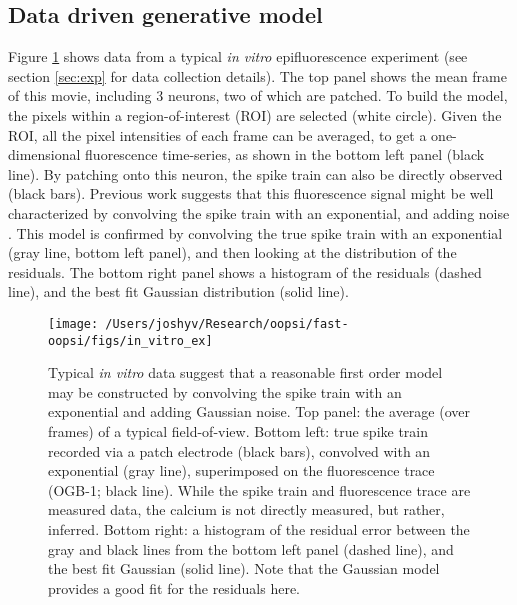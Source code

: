 \subsection{Data driven generative model} \label{sec:model}

Figure \ref{fig:in_vitro_ex} shows data from a typical \emph{in vitro} epifluorescence experiment (see section \ref{sec:exp} for data collection details).  The top panel shows the mean frame of this movie, including 3 neurons, two of which are patched.  To build the model, the pixels within a region-of-interest (ROI) are selected (white circle).  Given the ROI, all the pixel intensities of each frame can be averaged, to get a one-dimensional fluorescence time-series, as shown in the bottom left panel (black line).  By patching onto this neuron, the spike train can also be directly observed (black bars). Previous work suggests that this fluorescence signal might be well characterized by convolving the spike train with an exponential, and adding noise \cite{ImagingManual}.  This model is confirmed by convolving the true spike train with an exponential (gray line, bottom left panel), and then looking at the distribution of the residuals.  The bottom right panel shows a histogram of the residuals (dashed line), and the best fit Gaussian distribution (solid line).


\begin{figure}[h!]
\centering \texttt{[image: /Users/joshyv/Research/oopsi/fast-oopsi/figs/in\_vitro\_ex]}
\caption[data-based model]{Typical \emph{in vitro} data suggest that a reasonable first order model may be constructed by convolving the spike train with an exponential and adding Gaussian noise. Top panel: the average (over frames) of a typical field-of-view.  Bottom left: true spike train recorded via a patch electrode (black bars), convolved with an exponential (gray line), superimposed on the fluorescence trace (OGB-1; black line).  While the spike train and fluorescence trace are measured data, the calcium is not directly measured, but rather, inferred.  Bottom right: a histogram of the residual error between the gray and black lines from the bottom left panel (dashed line), and the best fit Gaussian (solid line). Note that the Gaussian model provides a good fit for the residuals here.} \label{fig:in_vitro_ex}
\end{figure}

